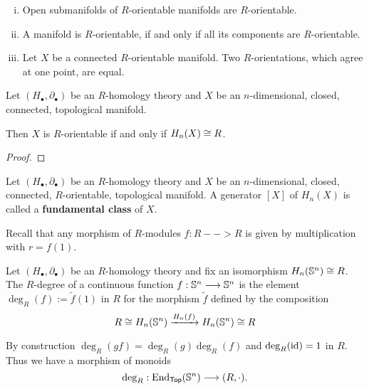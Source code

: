	\begin{lemma}\vspace{-1.5em}
		\begin{enumerate}[(i)]
			\item{
				Open submanifolds of $R$-orientable manifolds are $R$-orientable.
			}
			\item{
				A manifold is $R$-orientable, if and only if all its components are $R$-orientable.
			}
			\item{
				Let $X$ be a connected $R$-orientable manifold. Two $R$-orientations, which agree at one point, are equal.
			}
		\end{enumerate}
	\end{lemma}

	\begin{proposition}
		Let $(H_\bullet, \partial_\bullet)$ be an $R$-homology theory and $X$ be an $n$-dimensional, closed, connected, topological manifold. 

		Then $X$ is $R$-orientable if and only if $H_n(X) \isom R$.
	\end{proposition}
	\begin{proof}
	\end{proof}

	\begin{definition}
		Let $(H_\bullet, \partial_\bullet)$ be an $R$-homology theory and $X$ be an $n$-dimensional, closed, connected, $R$-orientable, topological manifold. A generator $[X]$ of $H_n(X)$ is called a \textbf{fundamental class} of $X$.
	\end{definition}

	Recall that any morphism of $R$-modules $f:R --> R$ is given by multiplication with $r = f(1)$.

	\begin{definition}
		Let $(H_\bullet,\partial_\bullet)$ be an $R$-homology theory and fix an isomorphism $H_n(\S^n) \isom R$. The $R$-degree of a continuous function $f:\S^n --> \S^n$ is the element $\deg_R(f) := \tilde{f}(1)$ in $R$ for the morphism $\tilde f$ defined by the composition
		\begin{equation*}
			R \isom H_n(\S^n) \xrightarrow{H_n(f)} H_n(\S^n)\isom R
		\end{equation*}
	\end{definition}

	\begin{remark}
		By construction $\deg_R(gf) = \deg_R(g)\deg_R(f)$ and $\deg_R(\id) = 1$ in $R$. Thus we have a morphism of monoids
		\begin{equation*}
			\deg_R: \End_\ncat{Top}(\S^n) \longrightarrow (R,\cdot).
		\end{equation*}
	\end{remark}

